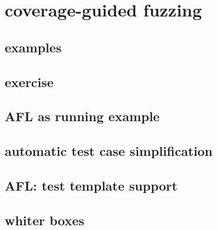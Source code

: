 \section{coverage-guided fuzzing}


\subsection{examples}


\subsection{exercise}


\subsection{AFL as running example}


\subsection{automatic test case simplification}


\subsection{AFL: test template support}


\subsection{whiter boxes}

